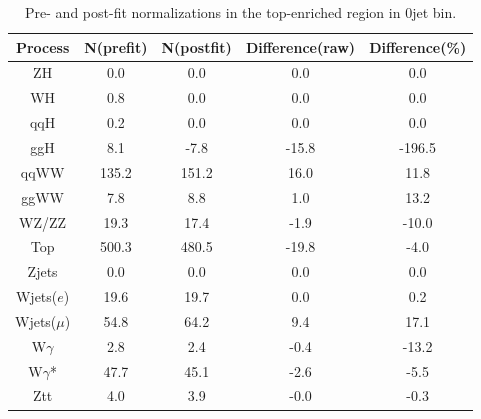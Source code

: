 \begin{table}[ht!]
\begin{center}
\begin{tabular}{c|cc|cc}
\hline
\hline
Process     &    N(prefit) &   N(postfit) & Difference(raw) &  Difference(\%)  \\  
\hline
\hline
ZH          &        0.0 &        0.0 &        0.0 &        0.0        \\
WH          &        0.8 &        0.0 &        0.0 &        0.0        \\
qqH         &        0.2 &        0.0 &        0.0 &        0.0        \\
ggH         &        8.1 &       -7.8 &      -15.8 &     -196.5        \\
\hline
qqWW        &      135.2 &      151.2 &       16.0 &       11.8        \\
ggWW        &        7.8 &        8.8 &        1.0 &       13.2        \\
\hline
WZ/ZZ       &       19.3 &       17.4 &       -1.9 &      -10.0        \\
\hline
Top         &      500.3 &      480.5 &      -19.8 &       -4.0        \\
\hline
Zjets       &        0.0 &        0.0 &        0.0 &        0.0        \\
\hline
Wjets($e$)  &       19.6 &       19.7 &        0.0 &        0.2        \\
Wjets($\mu$)&       54.8 &       64.2 &        9.4 &       17.1        \\
\hline
W$\gamma$   &        2.8 &        2.4 &       -0.4 &      -13.2        \\
W$\gamma$*  &       47.7 &       45.1 &       -2.6 &       -5.5        \\
\hline
Ztt         &        4.0 &        3.9 &       -0.0 &       -0.3        \\
\hline
\hline
\end{tabular}
\caption{Pre- and post-fit normalizations in the top-enriched region in 0jet bin.}
\label{tab:fitval_norm_top_0j}
\end{center}
\end{table}

